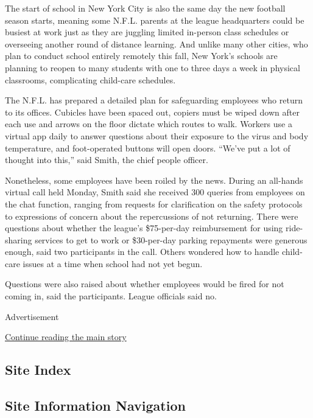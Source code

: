 The start of school in New York City is also the same day the new
football season starts, meaning some N.F.L. parents at the league
headquarters could be busiest at work just as they are juggling limited
in-person class schedules or overseeing another round of distance
learning. And unlike many other cities, who plan to conduct school
entirely remotely this fall, New York's schools are planning to reopen
to many students with one to three days a week in physical classrooms,
complicating child-care schedules.

The N.F.L. has prepared a detailed plan for safeguarding employees who
return to its offices. Cubicles have been spaced out, copiers must be
wiped down after each use and arrows on the floor dictate which routes
to walk. Workers use a virtual app daily to answer questions about their
exposure to the virus and body temperature, and foot-operated buttons
will open doors. ``We've put a lot of thought into this,'' said Smith,
the chief people officer.

Nonetheless, some employees have been roiled by the news. During an
all-hands virtual call held Monday, Smith said she received 300 queries
from employees on the chat function, ranging from requests for
clarification on the safety protocols to expressions of concern about
the repercussions of not returning. There were questions about whether
the league's \$75-per-day reimbursement for using ride-sharing services
to get to work or \$30-per-day parking repayments were generous enough,
said two participants in the call. Others wondered how to handle
child-care issues at a time when school had not yet begun.

Questions were also raised about whether employees would be fired for
not coming in, said the participants. League officials said no.

Advertisement

\protect\hyperlink{after-bottom}{Continue reading the main story}

\hypertarget{site-index}{%
\subsection{Site Index}\label{site-index}}

\hypertarget{site-information-navigation}{%
\subsection{Site Information
Navigation}\label{site-information-navigation}}

